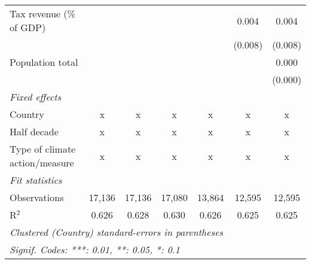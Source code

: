 \begin{tabular}{lcccccc}
   Tax revenue (\% of GDP)               &         &              &               &                & 0.004          & 0.004\\   
                                         &         &              &               &                & (0.008)        & (0.008)\\   
   Population total                      &         &              &               &                &                & 0.000\\   
                                         &         &              &               &                &                & (0.000)\\   
   \emph{Fixed effects}\\
   Country                               & x       & x            & x             & x              & x              & x\\  
   Half decade                           & x       & x            & x             & x              & x              & x\\  
   Type of climate action/measure        & x       & x            & x             & x              & x              & x\\  
   \midrule \emph{Fit statistics}\\
   Observations                          & 17,136  & 17,136       & 17,080        & 13,864         & 12,595         & 12,595\\  
   R$^2$                                 & 0.626   & 0.628        & 0.630         & 0.626          & 0.625          & 0.625\\  
   \midrule
   \multicolumn{7}{l}{\emph{Clustered (Country) standard-errors in parentheses}}\\
   \multicolumn{7}{l}{\emph{Signif. Codes: ***: 0.01, **: 0.05, *: 0.1}}\\
\end{tabular}
\par\endgroup


